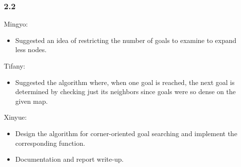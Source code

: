 \subsubsection*{2.2}
Mingyo:
\begin{itemize}[itemsep=0pt]
  \item Suggested an idea of restricting the number of goals to examine to expand less nodes.
\end{itemize}
Tifany:
\begin{itemize}[itemsep=0pt]
  \item Suggested the algorithm where, when one goal is reached, the next goal is determined by checking just its neighbors since goals were so dense on the given map.
\end{itemize}
Xinyue:
\begin{itemize}[itemsep=0pt]
  \item Design the algorithm for corner-oriented goal searching and implement the corresponding function.
  \item Documentation and report write-up.
\end{itemize}
